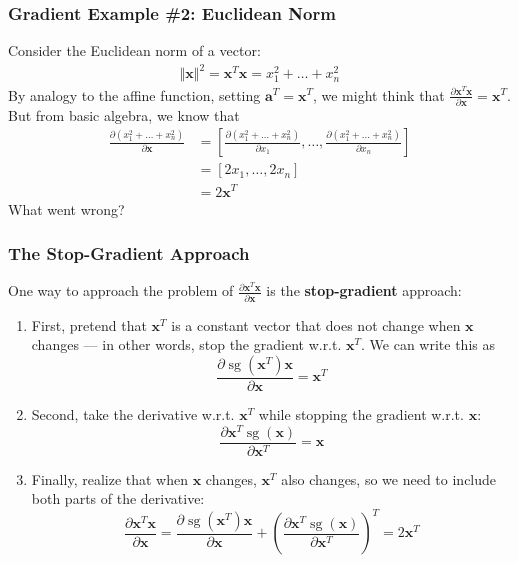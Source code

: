 \documentclass{beamer}
\DeclareMathOperator*{\sg}{sg}
\begin{document}
\begin{frame}
  \frametitle{Gradient Example \#2: Euclidean Norm}

  Consider the Euclidean norm of a vector:
  \begin{align*}
    \Vert\mathbf{x}\Vert^2=\mathbf{x}^T\mathbf{x}=x_1^2+\ldots+x_n^2
  \end{align*}
  By analogy to the affine function, setting
  $\mathbf{a}^T=\mathbf{x}^T$, we might think that
  $\frac{\partial\mathbf{x}^T\mathbf{x}}{\partial\mathbf{x}}=\mathbf{x}^T$. But
  from basic algebra, we know that
  \begin{align*}
    \frac{\partial(x_1^2+\ldots+x_n^2)}{\partial\mathbf{x}}
    &=\left[
      \frac{\partial(x_1^2+\ldots+x_n^2)}{\partial x_1},\ldots,
      \frac{\partial(x_1^2+\ldots+x_n^2)}{\partial x_n}
      \right]
    \\
    &=\left[2x_1,\ldots,2x_n\right]\\
    &=2\mathbf{x}^T
  \end{align*}
  What went wrong?
\end{frame}


\begin{frame}
  \frametitle{The Stop-Gradient Approach}

  One way to approach the problem of
  $\frac{\partial\mathbf{x}^T\mathbf{x}}{\partial\mathbf{x}}$ is the
  \textbf{stop-gradient} approach:
  \begin{enumerate}
  \item First, pretend that $\mathbf{x}^T$ is a constant vector that
    does not change when $\mathbf{x}$ changes --- in other words, stop
    the gradient w.r.t. $\mathbf{x}^T$.  We can write this as
    \begin{displaymath}
      \frac{\partial\sg(\mathbf{x}^T)\mathbf{x}}{\partial\mathbf{x}}=
      \mathbf{x}^T
    \end{displaymath}
  \item Second, take the derivative w.r.t. $\mathbf{x}^T$ while
    stopping the gradient w.r.t.  $\mathbf{x}$:
    \begin{displaymath}
      \frac{\partial\mathbf{x}^T\sg(\mathbf{x})}{\partial\mathbf{x}^T}=
      \mathbf{x}
    \end{displaymath}
  \item Finally, realize that when $\mathbf{x}$ changes,
    $\mathbf{x}^T$ also changes, so we need to include both parts of
    the derivative:
    \begin{displaymath}
      \frac{\partial\mathbf{x}^T\mathbf{x}}{\partial\mathbf{x}}=
      \frac{\partial\sg(\mathbf{x}^T)\mathbf{x}}{\partial\mathbf{x}}+
      \left(\frac{\partial\mathbf{x}^T\sg(\mathbf{x})}{\partial\mathbf{x}^T}\right)^T=
      2\mathbf{x}^T
    \end{displaymath}
  \end{enumerate}
\end{frame}
\end{document}
